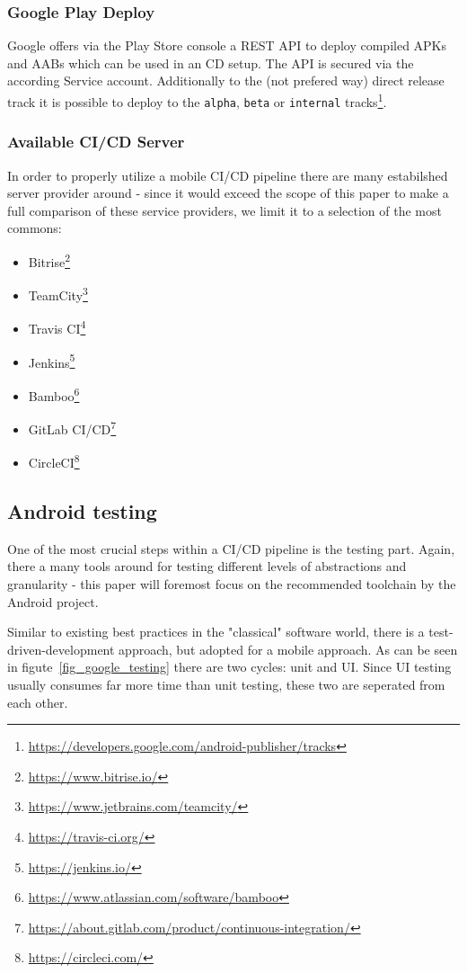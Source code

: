 \subsubsection{Google Play Deploy}
Google offers via the Play Store console a REST API to deploy compiled APKs and AABs which can be used in an CD setup. The API is secured via the according Service account. Additionally to the (not prefered way) direct release track it is possible to deploy to the \texttt{alpha}, \texttt{beta} or \texttt{internal} tracks\footnote{\url{https://developers.google.com/android-publisher/tracks}}.

\subsubsection{Available CI/CD Server}

In order to properly utilize a mobile CI/CD pipeline there are many estabilshed server provider around - since it would exceed the scope of this paper to make a full comparison of these service providers, we limit it to a selection of the most commons:

\begin{itemize}
	\item Bitrise\footnote{\url{https://www.bitrise.io/}}
	\item TeamCity\footnote{\url{https://www.jetbrains.com/teamcity/}}
	\item Travis CI\footnote{\url{https://travis-ci.org/}}
	\item Jenkins\footnote{\url{https://jenkins.io/}}
	\item Bamboo\footnote{\url{https://www.atlassian.com/software/bamboo}}
	\item GitLab CI/CD\footnote{\url{https://about.gitlab.com/product/continuous-integration/}}
	\item CircleCI\footnote{\url{https://circleci.com/}}
\end{itemize}

\subsection{Android testing}
One of the most crucial steps within a CI/CD pipeline is the testing part. Again, there a many tools around for testing different levels of abstractions and granularity - this paper will foremost focus on the recommended toolchain by the Android project.~\cite{doc:fundamental_testing}

Similar to existing best practices in the "classical" software world, there is a test-driven-development approach, but adopted for a mobile approach. As can be seen in figute~\ref{fig_google_testing} there are two cycles: unit and UI. Since UI testing usually consumes far more time than unit testing, these two are seperated from each other.

